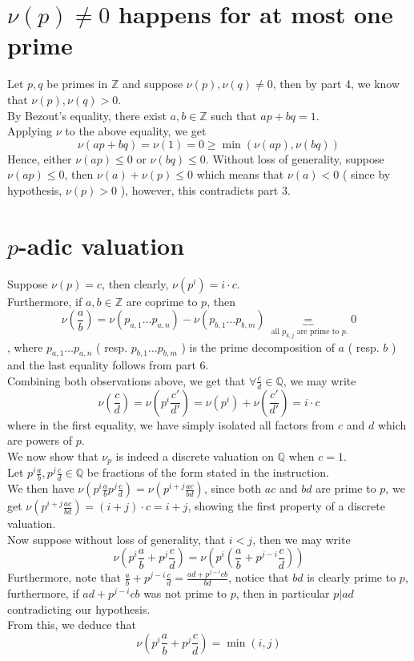 \documentclass[11pt, a4paper]{article}
\begin{document}
\section{$\nu( p) \neq 0$ happens for at most one prime}
Let $p,q$ be primes in $\mathbb{Z}$ and suppose $\nu( p) ,\nu( q) \neq 0$, then by part 4, we know that $\nu( p),\nu( q) >0 $.\\
By Bezout's equality, there exist $a,b \in \mathbb{Z}$ such that $ a p + bq =1$.\\
Applying $\nu$ to the above equality, we get
\[ 
\nu( ap + bq)  = \nu( 1) = 0 \geq \min ( \nu( ap) , \nu( bq) ) 
\]
Hence, either $ \nu( ap) \leq 0$ or $\nu( bq) \leq 0$. Without loss of generality, suppose $ \nu( ap) \leq 0$, then $\nu( a) +\nu( p) \leq 0$ which means that $\nu( a) <0$ ( since by hypothesis, $\nu( p) >0$ ), however, this contradicts part 3.
\section{$p$-adic valuation}
Suppose $\nu( p) = c$, then clearly, $\nu( p^{i}) = i\cdot c$.\\
Furthermore, if $a,b\in \mathbb{Z}$ are coprime to $p$, then
\[
\nu( \frac{a}{b}) = \nu( p_{a,1} \ldots p_{a,n} 	) - \nu( p_{b,1} \ldots p_{b,m} ) \underbrace{=}_{ \text{ all } p_{k,j} \text{ are prime to  } p.}0 
\]
, where $p_{a,1}\ldots p_{a,n}  $ ( resp. $ p_{b,1} \ldots p_{b,m} $  ) is the prime decomposition of $a$ ( resp. $b$ ) and the last equality follows from part 6.\\
Combining both observations above, we get that $ \forall \frac{c}{d}\in \mathbb{Q}$, we may write
\[ 
\nu( \frac{c}{d}) = \nu( p^{i} \frac{c'}{d'}) =\nu(p^{i}) + \nu( \frac{c'}{d'}) = i\cdot c
\]
where in the first equality, we have simply isolated all factors from $c$ and $d$ which are powers of $p$.\\
We now show that $\nu_p$ is indeed a discrete valuation on $ \mathbb{Q}$ when $c=1$.\\
Let $ p^{i} \frac{a}{b}, p^{j} \frac{c}{d}\in \mathbb{Q}$ be fractions of the form stated in the instruction.\\
We then have $\nu\left( p^{i} \frac{a}{b} p^{j} \frac{c}{d}	\right) = \nu( p^{i+j} \frac{ac}{bd})  $, since both $ac$ and $bd$ are prime to $p$, we get $\nu\left( p^{i+j} \frac{ac}{bd}\right) = ( i+j )\cdot c = i+j$, showing the first property of a discrete valuation.\\
Now suppose without loss of generality, that $ i<j$, then we may write 
\[ 
\nu( p^{i}\frac{a}{b}+ p^{j}\frac{c}{d}) = \nu\left( p^{i}\left( \frac{a}{b}+ p^{j-i} \frac{c}{d}\right) \right) 
\]
Furthermore, note that $ \frac{a}{b}+ p^{j-i}\frac{c}{d}= \frac{ad+ p^{j-i}cb}{bd}$, notice that $bd$ is clearly prime to $p$, furthermore, if $ad + p^{j-i}cb$ was not prime to $p$, then in particular $ p | ad$ contradicting our hypothesis.\\
From this, we deduce that 
\[ 
\nu( p^{i} \frac{a}{b}+ p^{j} \frac{c}{d}) = \min ( i,j) 	
\]
\end{document}
